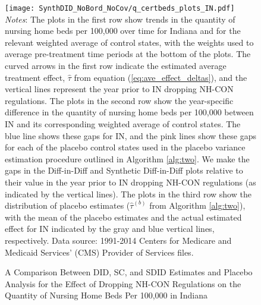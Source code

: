 \documentclass[../Main.tex]{subfiles}
\begin{document}
\newpage
{}
\begin{figure}[t] 
    \setlength{}
	\caption{\label{fig:q_certbeds_plots_in} \centering A Comparison Between DID, SC, and SDID Estimates and Placebo Analysis for the Effect of Dropping NH-CON Regulations on the Quantity of Nursing Home Beds Per 100,000 in Indiana} {\centering\texttt{[image: SynthDID\_NoBord\_NoCov/q\_certbeds\_plots\_IN.pdf]}}
    \vspace{-1.4cm}\\
    \scriptsize
		\textit{Notes}: The plots in the first row show trends in the quantity of nursing home beds per 100,000 over time for Indiana and for the relevant weighted average of control states, with the weights used to average pre-treatment time periods at the bottom of the plots. The curved arrows in the first row indicate the estimated average treatment effect, $\hat{\tau}$ from equation (\ref{eq:ave_effect_deltas}), and the vertical lines represent the year prior to IN dropping NH-CON regulations. The plots in the second row show the year-specific difference in the quantity of nursing home beds per 100,000 between IN and its corresponding weighted average of control states. The blue line shows these gaps for IN, and the pink lines show these gaps for each of the placebo control states used in the placebo variance estimation procedure outlined in Algorithm \ref{alg:two}. We make the gaps in the Diff-in-Diff and Synthetic Diff-in-Diff plots relative to their value in the year prior to IN dropping NH-CON regulations (as indicated by the vertical lines). The plots in the third row show the distribution of placebo estimates ($\hat{\tau}^{(b)}$ from Algorithm \ref{alg:two}), with the mean of the placebo estimates and the actual estimated effect for IN indicated by the gray and blue vertical lines, respectively. Data source: 1991-2014 Centers for Medicare and Medicaid Services’ (CMS) Provider of Services files.
\end{figure}
\restoregeometry
\clearpage
\end{document}
